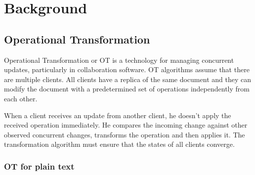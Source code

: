 \documentclass[a4paper, 11pt, oneside]{article}
\theoremstyle{definition}
\begin{document}
\section{Background}

\subsection{Operational Transformation}

Operational Transformation \cite{ot} or OT is a technology for managing concurrent updates, particularly in collaboration software. OT algorithms assume that there are multiple clients. All clients have a replica of the same document and they can modify the document with a predetermined set of operations independently from each other.

When a client receives an update from another client, he doesn't apply the received operation immediately. He compares the incoming change against other observed concurrent changes, transforms the operation and then applies it. The transformation algorithm must ensure that the states of all clients converge.

\subsubsection{OT for plain text}
\end{document}
